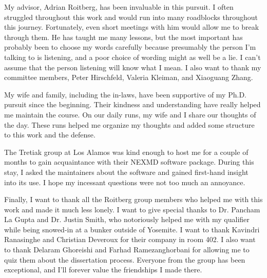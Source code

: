 My advisor, Adrian Roitberg, has been invaluable in this pursuit.
  I often struggled throughout this work and would run into many roadblocks throughout this journey.
  Fortunately, even short meetings with him would allow me to break through them.
He has taught me many lessons, but the most important has probably been to choose my words carefully because presumably the person I'm talking to is listening, and a poor choice of wording might as well be a lie. I can't assume that the person listening will know what I mean.
I also want to thank my committee members, Peter Hirschfeld, Valeria Kleiman, and Xiaoguang Zhang.

  My wife and family, including the in-laws, have been supportive of my Ph.D. pursuit since the beginning.
  Their kindness and understanding have really helped me maintain the course.
  On our daily runs, my wife and I share our thoughts of the day.
  These runs helped me organize my thoughts and added some structure to this work and the defense.

  The Tretiak group at Los Alamos was kind enough to host me for a couple of months to gain acquaintance with their NEXMD software package.
  During this stay, I asked the maintainers about the software and gained first-hand insight into its use.
  I hope my incessant questions were not too much an annoyance.

  Finally, I want to thank all the Roitberg group members who helped me with this work and made it much less lonely.
  I want to give special thanks to Dr. Pancham La Gupta and Dr. Justin Smith, who notoriously helped me with my qualifier while being snowed-in at a bunker outside of Yosemite.
  I want to thank Kavindri Ranasinghe and Christian Deveroux for their company in room 402. 
  I also want to thank Delaram Ghoreishi and Farhad Ramezanghorbani for allowing me to quiz them about the dissertation process.
  Everyone from the group has been exceptional, and I'll forever value the friendships I made there.
